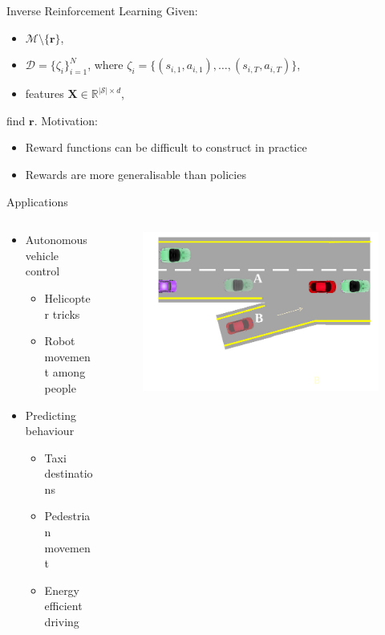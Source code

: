 \documentclass[handout,8pt]{beamer}
\begin{document}
\begin{frame}{Inverse Reinforcement Learning}
  Given:
  \begin{itemize}
  \item $\mathcal{M} \setminus \{ \mathbf{r} \}$,
  \item $\mathcal{D} = \{ \zeta_i \}_{i=1}^N$, where $\zeta_i = \{ (s_{i,1},
    a_{i,1}), \dots, (s_{i,T}, a_{i,T}) \}$,
  \item features $\mathbf{X} \in \mathbb{R}^{|\mathcal{S}| \times d}$,
  \end{itemize}
  find $\mathbf{r}$. Motivation:
  \begin{itemize}
  \item Reward functions can be difficult to construct in practice
  \item Rewards are more generalisable than policies
  \end{itemize}
  \begin{block}{Applications}
    \begin{columns}[T]
      \begin{column}{0.5\textwidth}
        \begin{itemize}
        \item Autonomous vehicle control
          \begin{itemize}
          \item Helicopter tricks
          \item Robot movement among people
          \end{itemize}
        \item Predicting behaviour
          \begin{itemize}
          \item Taxi destinations
          \item Pedestrian movement
          \item Energy efficient driving
          \end{itemize}
        \end{itemize}
      \end{column}
      \begin{column}{0.5\textwidth}
        \begin{figure}
          \centering
          \includegraphics[width=\textwidth]{cars.png}

\end{figure}
\end{column}
\end{columns}
\end{block}
\end{frame}
\end{document}
